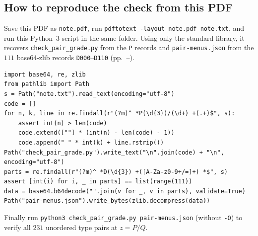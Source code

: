 \documentclass[11pt,letterpaper]{article}
\theoremstyle{cleanthm}
\begin{document}
\subsection{How to reproduce the check from this PDF}

Save this PDF as \texttt{note.pdf}, run \texttt{pdftotext -layout note.pdf note.txt}, and run this
Python~3 script in the same folder. Using only the standard library, it recovers
\texttt{check\_pair\_grade.py} from the \texttt{P} records and \texttt{pair-menus.json} from the
\(111\) base64-zlib records \texttt{D000}--\texttt{D110}
(pp.~\pageref{app:menus}--\pageref{app:menus-end}).
\begin{Verbatim}[fontsize=\fontsize{8.0pt}{9.2pt}\selectfont]
import base64, re, zlib
from pathlib import Path
s = Path("note.txt").read_text(encoding="utf-8")
code = []
for n, k, line in re.findall(r"(?m)^ *P(\d{3})/(\d+) +(.+)$", s):
    assert int(n) > len(code)
    code.extend([""] * (int(n) - len(code) - 1))
    code.append(" " * int(k) + line.rstrip())
Path("check_pair_grade.py").write_text("\n".join(code) + "\n", encoding="utf-8")
parts = re.findall(r"(?m)^ *D(\d{3}) +([A-Za-z0-9+/=]+) *$", s)
assert [int(i) for i, _ in parts] == list(range(111))
data = base64.b64decode("".join(v for _, v in parts), validate=True)
Path("pair-menus.json").write_bytes(zlib.decompress(data))
\end{Verbatim}
Finally run \texttt{python3 check\_pair\_grade.py pair-menus.json} (without \texttt{-O}) to verify
all \(231\) unordered type pairs at \(z=P/Q\).

\clearpage
{}
\end{document}
